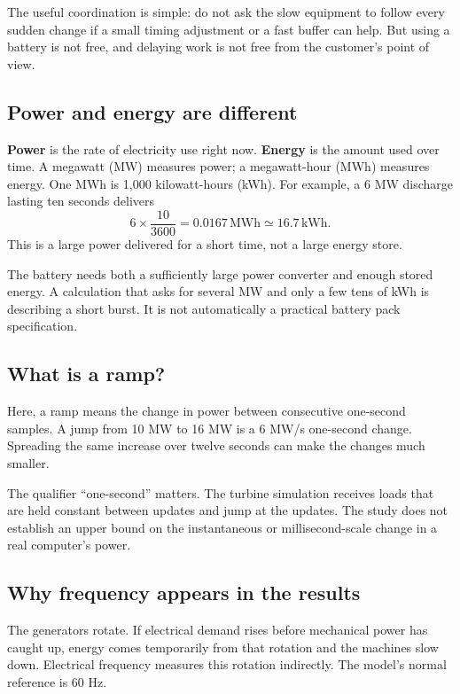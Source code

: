 \documentclass[11pt]{article}
\newcommand{\MWh}{\,\mathrm{MWh}}
\newcommand{\kWh}{\,\mathrm{kWh}}
\begin{document}
The useful coordination is simple: do not ask the slow equipment to
follow every sudden change if a small timing adjustment or a fast buffer
can help. But using a battery is not free, and delaying work is not free
from the customer's point of view.

\subsection{Power and energy are different}

\textbf{Power} is the rate of electricity use right now. \textbf{Energy}
is the amount used over time. A megawatt (MW) measures power; a
megawatt-hour (MWh) measures energy. One MWh is 1,000 kilowatt-hours (kWh).
For example, a 6 MW discharge lasting ten seconds delivers
\[
6\times\frac{10}{3600}=0.0167\MWh \simeq 16.7\kWh.
\]
This is a large power delivered for a short time, not a large energy store.

The battery needs both a sufficiently large power converter and enough
stored energy. A calculation that asks for several MW and only a few
tens of kWh is describing a short burst. It is not automatically a
practical battery pack specification.

\subsection{What is a ramp?}

Here, a ramp means the change in power between consecutive one-second
samples. A jump from 10 MW to 16 MW is a 6 MW/s one-second change.
Spreading the same increase over twelve seconds can make the changes
much smaller.

The qualifier ``one-second'' matters. The turbine simulation receives
loads that are held constant between updates and jump at the updates.
The study does not establish an upper bound on the instantaneous or
millisecond-scale change in a real computer's power.

\subsection{Why frequency appears in the results}

The generators rotate. If electrical demand rises before mechanical
power has caught up, energy comes temporarily from that rotation and
the machines slow down. Electrical frequency measures this rotation
indirectly. The model's normal reference is 60 Hz.
\end{document}
